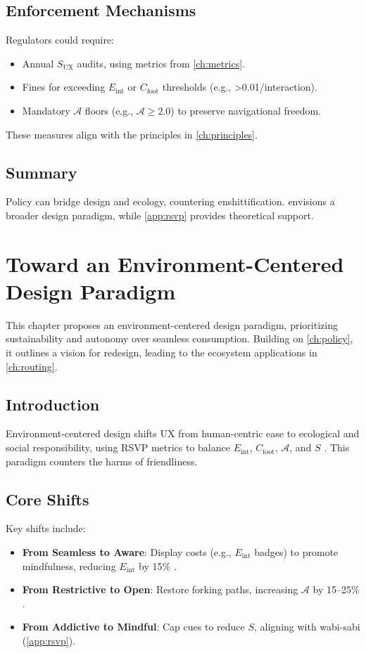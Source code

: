 \documentclass[openany]{book}
\newcommand{\Sent}{S} %
\newcommand{\Eint}{E_{\mathrm{int}}} %
\newcommand{\Cfoot}{C_{\mathrm{foot}}} %
\newcommand{\Auton}{\mathcal{A}} %
\newcommand{\SUX}{S_{\mathrm{UX}}} %
\newcommand{\kWh}{\mathrm{kWh}}
\begin{document}
\section{Enforcement Mechanisms}
\label{sec:policy-enforce}
Regulators could require:
\begin{itemize}
  \item Annual $\SUX$ audits, using metrics from \cref{ch:metrics}.
  \item Fines for exceeding $\Eint$ or $\Cfoot$ thresholds (e.g., \SI{>0.01}{\kWh}/interaction).
  \item Mandatory $\Auton$ floors (e.g., $\Auton \geq 2.0$) to preserve navigational freedom.
\end{itemize}
These measures align with the principles in \cref{ch:principles}.

\section{Summary}
Policy can bridge design and ecology, countering enshittification.  envisions a broader design paradigm, while \cref{app:rsvp} provides theoretical support.

\chapter{Toward an Environment-Centered Design Paradigm}
\label{ch:paradigm}

This chapter proposes an environment-centered design paradigm, prioritizing sustainability and autonomy over seamless consumption. Building on \cref{ch:policy}, it outlines a vision for redesign, leading to the ecosystem applications in \cref{ch:routing}.

\section{Introduction}
\label{sec:paradigm-intro}
Environment-centered design shifts UX from human-centric ease to ecological and social responsibility, using RSVP metrics to balance $\Eint$, $\Cfoot$, $\Auton$, and $\Sent$ \citep{colak2024,doctorow2022}. This paradigm counters the harms of friendliness.

\section{Core Shifts}
\label{sec:paradigm-shifts}
Key shifts include:
\begin{itemize}
  \item \textbf{From Seamless to Aware}: Display costs (e.g., $\Eint$ badges) to promote mindfulness, reducing $\Eint$ by 15\% \citep{colak2024}.
  \item \textbf{From Restrictive to Open}: Restore forking paths, increasing $\Auton$ by 15–25\% \citep{doctorow2022}.
  \item \textbf{From Addictive to Mindful}: Cap cues to reduce $\Sent$, aligning with wabi-sabi (\cref{app:rsvp}).
\end{itemize}
\end{document}
